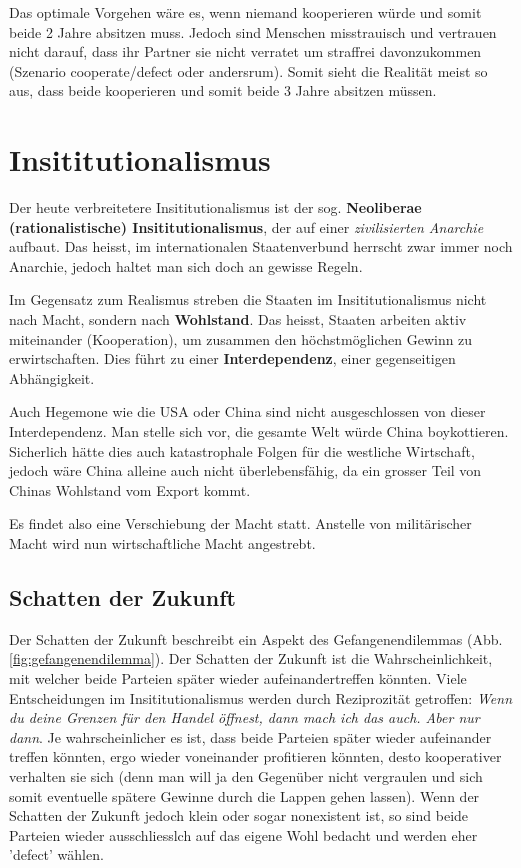 \documentclass[a4paper, 11pt]{article}
\begin{document}
Das optimale Vorgehen wäre es, wenn niemand kooperieren würde und somit beide 2 Jahre absitzen muss. Jedoch sind Menschen misstrauisch und vertrauen nicht darauf, dass ihr Partner sie nicht verratet um straffrei davonzukommen (Szenario cooperate/defect oder andersrum). Somit sieht die Realität meist so aus, dass beide kooperieren und somit beide 3 Jahre absitzen müssen.

\newpage

\section{Insititutionalismus}

Der heute verbreitetere Insititutionalismus ist der sog. \textbf{Neoliberae (rationalistische) Insititutionalismus}, der auf einer \textit{zivilisierten Anarchie} aufbaut. Das heisst, im internationalen Staatenverbund herrscht zwar immer noch Anarchie, jedoch haltet man sich doch an gewisse Regeln.

Im Gegensatz zum Realismus streben die Staaten im Insititutionalismus nicht nach Macht, sondern nach \textbf{Wohlstand}. Das heisst, Staaten arbeiten aktiv miteinander (Kooperation), um zusammen den höchstmöglichen Gewinn zu erwirtschaften. Dies führt zu einer \textbf{Interdependenz}, einer gegenseitigen Abhängigkeit. 

Auch Hegemone wie die USA oder China sind nicht ausgeschlossen von dieser Interdependenz. Man stelle sich vor, die gesamte Welt würde China boykottieren. Sicherlich hätte dies auch katastrophale Folgen für die westliche Wirtschaft, jedoch wäre China alleine auch nicht überlebensfähig, da ein grosser Teil von Chinas Wohlstand vom Export kommt.

Es findet also eine Verschiebung der Macht statt. Anstelle von militärischer Macht wird nun wirtschaftliche Macht angestrebt.

\subsection{Schatten der Zukunft}
Der Schatten der Zukunft beschreibt ein Aspekt des Gefangenendilemmas (Abb. \ref{fig:gefangenendilemma}). Der Schatten der Zukunft ist die Wahrscheinlichkeit, mit welcher beide Parteien später wieder aufeinandertreffen könnten. Viele Entscheidungen im Insititutionalismus werden durch Reziprozität getroffen: \textit{Wenn du deine Grenzen für den Handel öffnest, dann mach ich das auch. Aber nur dann}. Je wahrscheinlicher es ist, dass beide Parteien später wieder aufeinander treffen könnten, ergo wieder voneinander profitieren könnten, desto kooperativer verhalten sie sich (denn man will ja den Gegenüber nicht vergraulen und sich somit eventuelle spätere Gewinne durch die Lappen gehen lassen). Wenn der Schatten der Zukunft jedoch klein oder sogar nonexistent ist, so sind beide Parteien wieder ausschliesslch auf das eigene Wohl bedacht und werden eher 'defect' wählen.
\end{document}
